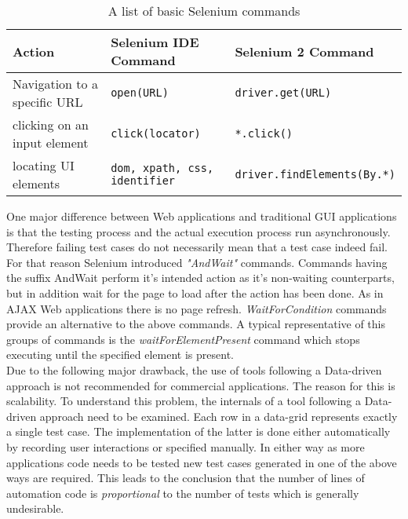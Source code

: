 \documentclass[12pt, notitlepage]{article}
\begin{document}
\begin{table}[H]
	\begin{tabularx}{\textwidth}{l|X|X}
		\textbf{Action} & \textbf{Selenium IDE Command\cite{ide-commands}} & \textbf{Selenium 2 Command\footnotemark\cite{selenium2-commands}} \\
		\hline
		Navigation to a specific URL & \texttt{open(URL)} & \texttt{driver.get(URL)}\\
		clicking on an input element & \texttt{click(locator)} & \texttt{*.click()}\footnotemark\\
		locating UI elements & \texttt{dom, xpath, css, identifier}\footnotemark & \texttt{driver.findElements(By.*)}\footnotemark\\
	\end{tabularx}
	\caption{A list of basic Selenium commands}
	\label{tab:selenium-commands}
\end{table}


One major difference between Web applications and traditional GUI applications is that the testing process and the actual execution process run asynchronously. Therefore failing test cases do not necessarily mean that a test case indeed fail. For that reason 
Selenium introduced \textit{"AndWait"} commands. Commands having the suffix AndWait perform it's intended action as it's
non-waiting counterparts, but in addition wait for the page to load after the action has been done. As in AJAX Web applications there
is no page refresh. \textit{WaitForCondition} commands provide an alternative to the above commands. A typical representative of
this groups of commands is the \textit{waitForElementPresent} command which stops executing until the specified element is present.
\\
Due to the following major drawback, the use of tools following a Data-driven approach is not recommended for commercial applications. The reason for this
is scalability. To understand this problem, the internals of a tool following a Data-driven approach need to be examined. Each row in a data-grid represents exactly 
a single test case. The implementation of the latter is done either automatically by recording user interactions or specified manually.
In either way as more applications code needs to be tested new test cases generated in one of the above ways are required. 
This leads to the conclusion that the number of lines of automation code is \textit{proportional} to the number of tests\cite{record-playback} which is generally 
undesirable. 
\end{document}

